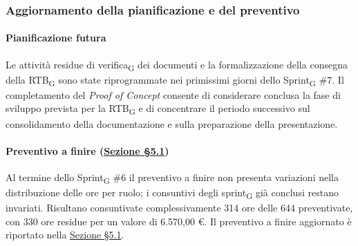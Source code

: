 ﻿\documentclass[a4paper, 10pt, colorlinks=true, linkcolor=black, urlcolor=blue, citecolor=blue, hidelinks]{article}
\begin{document}
\subsubsection{Aggiornamento della pianificazione e del preventivo}

\paragraph{Pianificazione futura}
Le attività residue di verifica\textsubscript{G} dei documenti e la formalizzazione della consegna della RTB\textsubscript{G} sono state riprogrammate nei primissimi giorni dello Sprint\textsubscript{G} \#7. Il completamento del \textit{Proof of Concept} consente di considerare conclusa la fase di sviluppo prevista per la RTB\textsubscript{G} e di concentrare il periodo successivo sul consolidamento della documentazione e sulla preparazione della presentazione.

\paragraph{Preventivo a finire (\hyperref[tab:preventivo-finire]{Sezione \S5.1})}
Al termine dello Sprint\textsubscript{G} \#6 il preventivo a finire non presenta variazioni nella distribuzione delle ore per ruolo; i consuntivi degli sprint\textsubscript{G} già conclusi restano invariati. Risultano consuntivate complessivamente 314 ore delle 644 preventivate, con 330 ore residue per un valore di 6.570,00 €. Il preventivo a finire aggiornato è riportato nella \hyperref[tab:preventivo-finire]{Sezione \S5.1}.
\end{document}
